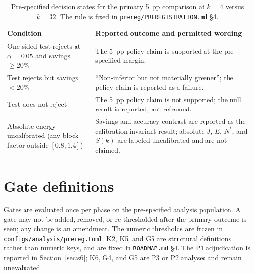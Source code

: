 \begin{table}[pos=htbp]
  \centering
  \caption{Pre-specified decision states for the primary 5~pp comparison at $k=4$ versus
  $k=32$. The rule is fixed in \texttt{prereg/PREREGISTRATION.md} \S4.}
  \label{tab:decision}
  \begin{tabularx}{\textwidth}{>{\raggedright\arraybackslash}p{5.4cm}>{\raggedright\arraybackslash}X}
    \toprule
    \textbf{Condition} & \textbf{Reported outcome and permitted wording} \\
    \midrule
    One-sided test rejects at $\alpha=0.05$ and savings $\ge20\%$ &
    The 5~pp policy claim is supported at the pre-specified margin. \\
    Test rejects but savings $<20\%$ &
    ``Non-inferior but not materially greener''; the policy claim is reported as a failure. \\
    Test does not reject &
    The 5~pp policy claim is not supported; the null result is reported, not reframed. \\
    Absolute energy uncalibrated (any block factor outside $[0.8,1.4]$) &
    Savings and accuracy contrast are reported as the calibration-invariant result; absolute
    $J$, $E$, $N^{*}$, and $S(k)$ are labeled uncalibrated and are not claimed. \\
    \bottomrule
  \end{tabularx}
\end{table}

\section{Gate definitions}\label{sec:s3}

Gates are evaluated once per phase on the pre-specified analysis population. A gate may not be
added, removed, or re-thresholded after the primary outcome is seen; any change is an amendment.
The numeric thresholds are frozen in \texttt{configs/analysis/prereg.toml}. K2, K5, and G5 are
structural definitions rather than numeric keys, and are fixed in \texttt{ROADMAP.md} \S4. The
P1 adjudication is reported in Section~\ref{sec:s6}; K6, G4, and G5 are P3 or P2 analyses and
remain unevaluated.

